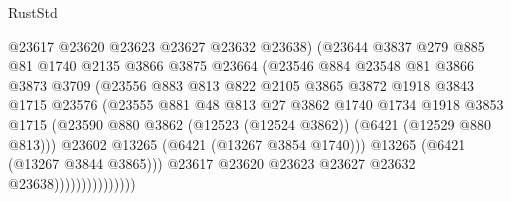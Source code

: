 \begin{lexlean}{RustStd}
\begin{coremodule}
                                @23617
                                @23620
                                @23623
                                @23627
                                @23632
                                @23638)
                              (@23644
                                @3837
                                @279
                                @885
                                @81
                                @1740
                                @2135
                                @3866
                                @3875
                                @23664
                                (@23546
                                  @884
                                  @23548
                                  @81
                                  @3866
                                  @3873
                                  @3709
                                  (@23556
                                    @883
                                    @813
                                    @822
                                    @2105
                                    @3865
                                    @3872
                                    @1918
                                    @3843
                                    @1715
                                    @23576
                                    (@23555
                                      @881
                                      @48
                                      @813
                                      @27
                                      @3862
                                      @1740
                                      @1734
                                      @1918
                                      @3853
                                      @1715
                                      (@23590
                                        @880
                                        @3862
                                        (@12523 (@12524 @3862))
                                        (@6421 (@12529 @880 @813)))
                                      @23602
                                      @13265
                                      (@6421 (@13267 @3854 @1740)))
                                    @13265
                                    (@6421 (@13267 @3844 @3865)))
                                  @23617
                                  @23620
                                  @23623
                                  @23627
                                  @23632
                                  @23638)))))))))))))))

\end{coremodule}
\end{lexlean}
